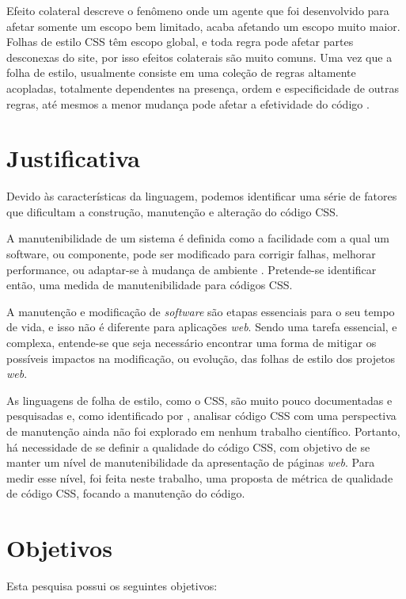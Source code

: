 Efeito colateral descreve o fenômeno onde um agente que foi desenvolvido para afetar somente um escopo bem limitado, acaba afetando um escopo muito maior. Folhas de estilo CSS têm escopo global, e toda regra pode afetar partes desconexas do site, por isso efeitos colaterais são muito comuns. Uma vez que a folha de estilo, usualmente consiste em uma coleção de regras altamente acopladas, totalmente dependentes na presença, ordem e especificidade de outras regras, até mesmos a menor mudança pode afetar a efetividade do código \cite{Walton:2015}.

\section{Justificativa}

Devido às características da linguagem, podemos identificar uma série de fatores que dificultam a construção, manutenção e alteração do código CSS. 

A manutenibilidade de um sistema é definida como a facilidade com a qual um software, ou componente, pode ser modificado para corrigir falhas, melhorar performance, ou adaptar-se à mudança de ambiente \cite{Ieee1990}. Pretende-se identificar então, uma medida de manutenibilidade para códigos CSS.

A manutenção e modificação de \textit{software} são etapas essenciais para o seu tempo de vida, e isso não é diferente para aplicações \textit{web}. Sendo uma tarefa essencial, e complexa, entende-se que seja necessário encontrar uma forma de mitigar os possíveis impactos na modificação, ou evolução, das folhas de estilo dos projetos \textit{web}.

As linguagens de folha de estilo, como o CSS, são muito pouco documentadas e pesquisadas \cite{Marden1999,Quint2007,Geneves2012} e, como identificado por , analisar código CSS com uma perspectiva de manutenção ainda não foi explorado em nenhum trabalho científico. Portanto, há necessidade de se definir a qualidade do código CSS, com objetivo de se manter um nível de manutenibilidade da apresentação de páginas \textit{web}. Para medir esse nível, foi feita neste trabalho, uma proposta de métrica de qualidade de código CSS, focando a manutenção do código.

\section{Objetivos}
Esta pesquisa possui os seguintes objetivos:

